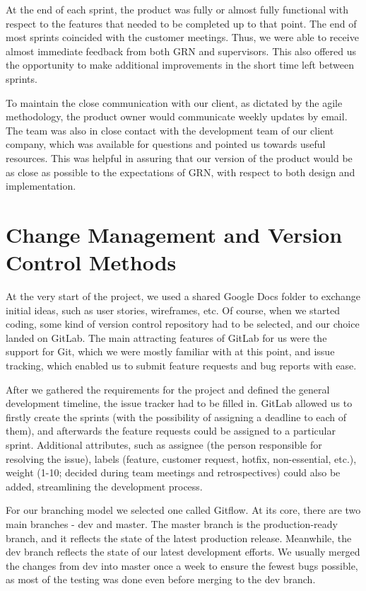 \documentclass{l3proj}
\begin{document}
At the end of each sprint, the product was fully or almost fully
 functional with respect to the features that needed to be completed
 up to that point. The end of most sprints coincided with the customer
 meetings. Thus, we were able to receive almost immediate feedback
 from both GRN and supervisors. This also offered us the opportunity
 to make additional improvements in the short time left between sprints.

To maintain the close communication with our client, as dictated by
 the agile methodology, the product owner would communicate weekly
 updates by email. The team was also in close contact with the
 development team of our client company, which was available
 for questions and pointed us towards useful resources. This
 was helpful in assuring that our version of the product would
 be as close as possible to the expectations of GRN, with respect
 to both design and implementation.

\newpage
\section{Change Management and Version Control Methods}
\label{sec:changemgmt}

At the very start of the project, we used a shared Google Docs folder 
 to exchange initial ideas, such as user stories, wireframes, etc. 
 Of course, when we started coding, some kind of version control 
 repository had to be selected, and our choice landed on GitLab. 
 The main attracting features of GitLab for us were the support for 
 Git, which we were mostly familiar with at this point, and issue 
 tracking, which enabled us to submit feature requests and bug reports 
 with ease.

After we gathered the requirements for the project and defined the general 
 development timeline, the issue tracker had to be filled in. GitLab allowed 
 us to firstly create the sprints (with the possibility of assigning a deadline
 to each of them), and afterwards the feature requests could be assigned to a 
 particular sprint. Additional attributes, such as assignee (the person 
 responsible for resolving the issue), labels (feature, customer request, 
 hotfix, non-essential, etc.), weight (1-10; decided during team meetings 
 and retrospectives) could also be added, streamlining the development process.

For our branching model we selected one called Gitflow\cite{gitflow}. At 
 its core, there are two main branches - dev and master. The master branch 
 is the production-ready branch, and it reflects the state of the latest 
 production release. Meanwhile, the dev branch reflects the state of our 
 latest development efforts. We usually merged the changes from dev into 
 master once a week to ensure the fewest bugs possible, as most 
 of the testing was done even before merging to the dev branch.
\end{document}
